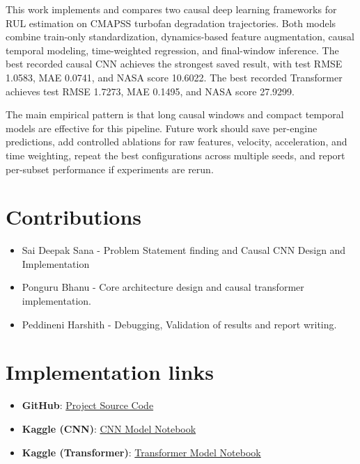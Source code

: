 \documentclass[11pt,a4paper]{article}
\begin{document}
This work implements and compares two causal deep learning frameworks for RUL estimation on CMAPSS turbofan degradation trajectories. Both models combine train-only standardization, dynamics-based feature augmentation, causal temporal modeling, time-weighted regression, and final-window inference. The best recorded causal CNN achieves the strongest saved result, with test RMSE 1.0583, MAE 0.0741, and NASA score 10.6022. The best recorded Transformer achieves test RMSE 1.7273, MAE 0.1495, and NASA score 27.9299.

The main empirical pattern is that long causal windows and compact temporal models are effective for this pipeline. Future work should save per-engine predictions, add controlled ablations for raw features, velocity, acceleration, and time weighting, repeat the best configurations across multiple seeds, and report per-subset performance if experiments are rerun.

\section{Contributions}
\begin{itemize}
    \item Sai Deepak Sana - Problem Statement finding and Causal CNN Design and Implementation
    \item Ponguru Bhanu - Core architecture design and causal transformer implementation.
    \item Peddineni Harshith - Debugging, Validation of results and report writing.
\end{itemize}

\section{Implementation links}
\begin{itemize}
    \item \textbf{GitHub}: \href{https://github.com/saideepaksana/Causal-Deep-Learning-Framework-for-Remaining-Useful-Life-Estimation-in-Turbofan-Engines}{Project Source Code}
    \item \textbf{Kaggle (CNN)}: \href{https://www.kaggle.com/code/bhanuponguru2024/ml4ps-cnn}{CNN Model Notebook}
    \item \textbf{Kaggle (Transformer)}: \href{https://www.kaggle.com/code/bhanuponguru2024/ml4ps-transformer}{Transformer Model Notebook}
\end{itemize}

\newpage
\end{document}
